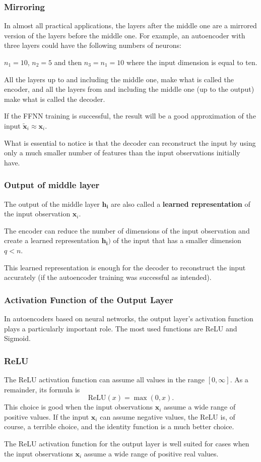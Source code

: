 \documentclass{beamer}
\begin{document}
\begin{frame}
\frametitle{Mirroring}

In almost all practical applications,
the layers after the middle one are a mirrored version of the layers before the middle one.
For example, an autoencoder with three layers could have the following numbers of neurons:

$n_{1} = 10$, $n_{2} = 5$ and then $n_{3} = n_{1} = 10$ where the input dimension is equal to ten.

All the layers up to and including the middle one, make what is called the encoder, and all the layers from and including
the middle one (up to the output) make what is called the decoder.

If the FFNN training is successful, the result will
be a good approximation of the input $\tilde{\mathbf{x}}_{i}\approx\mathbf{x}_{i}$.

What is essential to notice is that the decoder can reconstruct the
input by using only a much smaller number of features than the input
observations initially have.
\end{frame}

\begin{frame}
\frametitle{Output of middle layer}

The output of the middle layer
$\mathbf{h}_{\mathbf{i}}$ are also called a \textbf{learned representation} of the input observation $\mathbf{x}_{i}$.

The encoder can reduce the number of dimensions of the input
observation and create a learned representation
$\mathbf{h}_{\mathbf{i}}\mathbf{) }$ of the input that has a smaller
dimension $q<n$.

This learned representation is enough for the decoder to reconstruct
the input accurately (if the autoencoder training was successful as
intended).
\end{frame}

\begin{frame}
\frametitle{Activation Function of the Output Layer}

In autoencoders based on neural networks, the output layer's
activation function plays a particularly important role.  The most
used functions are ReLU and Sigmoid.
\end{frame}

\begin{frame}
\frametitle{ReLU}

The  ReLU activation function can assume all values in the range $\left[0,\infty\right]$. As a remainder, its formula is
\[
\textrm{ReLU}\left(x\right) = \max\left(0,x\right).
\]
This choice is good when the input observations \(\mathbf{x}_{i}\) assume a wide range of positive values.
If the input $\mathbf{x}_{i}$ can assume negative values, the ReLU is, of course, a terrible choice, and the identity function is a much better choice.

The ReLU activation function for the output layer is well suited for cases when the input observations \(\mathbf{x}_{i}\) assume a wide range of positive real values.
\end{frame}
\end{document}
